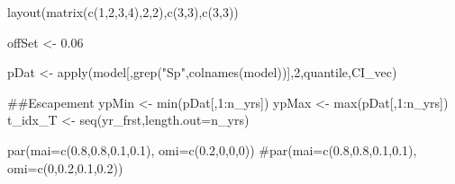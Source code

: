 \documentclass[
  11pt,
]{article}
\newenvironment{Shaded}{}{}
\newcommand{\CommentTok}[1]{\textcolor[rgb]{0.00,0.50,0.00}{#1}}
\newcommand{\DataTypeTok}[1]{#1}
\newcommand{\DecValTok}[1]{#1}
\newcommand{\FloatTok}[1]{#1}
\newcommand{\KeywordTok}[1]{\textcolor[rgb]{0.00,0.00,1.00}{#1}}
\newcommand{\NormalTok}[1]{#1}
\newcommand{\OperatorTok}[1]{#1}
\newcommand{\StringTok}[1]{\textcolor[rgb]{0.00,0.50,0.50}{#1}}
\begin{document}
\begin{Shaded}
\begin{Highlighting}[]
\KeywordTok{layout}\NormalTok{(}\KeywordTok{matrix}\NormalTok{(}\KeywordTok{c}\NormalTok{(}\DecValTok{1}\NormalTok{,}\DecValTok{2}\NormalTok{,}\DecValTok{3}\NormalTok{,}\DecValTok{4}\NormalTok{),}\DecValTok{2}\NormalTok{,}\DecValTok{2}\NormalTok{),}\KeywordTok{c}\NormalTok{(}\DecValTok{3}\NormalTok{,}\DecValTok{3}\NormalTok{),}\KeywordTok{c}\NormalTok{(}\DecValTok{3}\NormalTok{,}\DecValTok{3}\NormalTok{))}


\NormalTok{offSet <-}\StringTok{ }\FloatTok{0.06}



\NormalTok{pDat <-}\StringTok{ }\KeywordTok{apply}\NormalTok{(model[,}\KeywordTok{grep}\NormalTok{(}\StringTok{"Sp"}\NormalTok{,}\KeywordTok{colnames}\NormalTok{(model))],}\DecValTok{2}\NormalTok{,quantile,CI_vec)}

\CommentTok{##Escapement}
\NormalTok{ypMin <-}\StringTok{ }\KeywordTok{min}\NormalTok{(pDat[,}\DecValTok{1}\OperatorTok{:}\NormalTok{n_yrs])}
\NormalTok{ypMax <-}\StringTok{ }\KeywordTok{max}\NormalTok{(pDat[,}\DecValTok{1}\OperatorTok{:}\NormalTok{n_yrs])}
\NormalTok{t_idx_T <-}\StringTok{ }\KeywordTok{seq}\NormalTok{(yr_frst,}\DataTypeTok{length.out=}\NormalTok{n_yrs)}

\KeywordTok{par}\NormalTok{(}\DataTypeTok{mai=}\KeywordTok{c}\NormalTok{(}\FloatTok{0.8}\NormalTok{,}\FloatTok{0.8}\NormalTok{,}\FloatTok{0.1}\NormalTok{,}\FloatTok{0.1}\NormalTok{), }\DataTypeTok{omi=}\KeywordTok{c}\NormalTok{(}\FloatTok{0.2}\NormalTok{,}\DecValTok{0}\NormalTok{,}\DecValTok{0}\NormalTok{,}\DecValTok{0}\NormalTok{))}
\CommentTok{#par(mai=c(0.8,0.8,0.1,0.1), omi=c(0,0.2,0.1,0.2))}


\end{Highlighting}
\end{Shaded}
\end{document}
